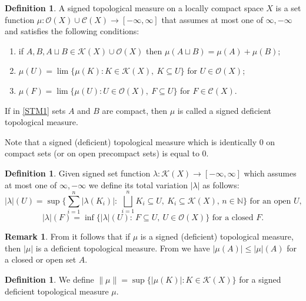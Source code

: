 \documentclass[sn-mathphys-num]{sn-jnl}%
\theoremstyle{thmstyleone}%
\theoremstyle{definition}
\newtheorem{definition}[theorem]{Definition}
\newtheorem{remark}[theorem]{Remark}
\begin{document}
\begin{definition} \label{STMLC}
A signed topological measure on a locally compact space $X$ is a set function
$\mu: \mathscr{O}(X) \cup \mathscr{C}(X) \rightarrow [-\infty, \infty]$  that assumes at most one of $\infty, 
-\infty$ and satisfies the following conditions:
\begin{enumerate}[label=(STM\arabic*),ref=(STM\arabic*)]
\item \label{STM1} 
if $A,B, A \sqcup B \in \mathscr{K}(X) \cup \mathscr{O}(X) $ then
$\mu(A\sqcup B)=\mu(A)+\mu(B);$
\item \label{STM2}  
$\mu(U)=\lim\{\mu(K):K \in \mathscr{K}(X), \  K \subseteq U\}
$ for $U\in\mathscr{O}(X)$;
\item \label{STM3}
$\mu(F)=\lim\{\mu(U):U \in \mathscr{O}(X), \ F \subseteq U\}$ for  $F \in \mathscr{C}(X)$.
\end{enumerate}
If in \ref{STM1} sets $A$ and $B$ are compact, then $\mu$ is called a signed deficient topological measure. 
\end{definition} 

Note that a signed (deficient) topological measure which is identically 0 on compact sets (or on open precompact sets)  is equal to 0.

\begin{definition} \label{laplu}
Given signed set function $\lambda: \mathscr{K}(X)  \longrightarrow [-\infty, \infty] $ which assumes at most one of $ \infty, -\infty$
we define its total variation $| \lambda|$  
as follows: 
$$|\lambda| (U) = \sup \{ \sum_{i=1}^n |\lambda(K_i)| : \  \bigsqcup_{i=1}^n K_i \subseteq U, \ K_i \subseteq \mathscr{K}(X),  \, n \in \mathbb{N} \} \text{   for an open  } U, $$
$$ |\lambda| (F)  = \inf\{ |\lambda| (U) : \ F \subseteq U, \ U \in \mathscr{O}(X)\} \text{   for a closed  } F. $$
\end{definition}

\begin{remark} \label{totvardtm}
From \cite[Th. 3.8]{Butler:DTMLC} it follows that if $ \mu$ is a signed (deficient) topological measure, then $ | \mu |$ is a deficient topological measure.
From \cite[L. 2.3]{Butler:DTMLC} we have $ |\mu(A)| \le |\mu| (A)$ for a closed or open set $A$. 
\end{remark}

\begin{definition} \label{SDTMnorDe}
We define  $\| \mu \| = \sup \{ | \mu(K)|  :  K \in  \mathscr{K}(X) \} $ for a signed deficient topological measure $\mu$.
\end{definition}
\end{document}
